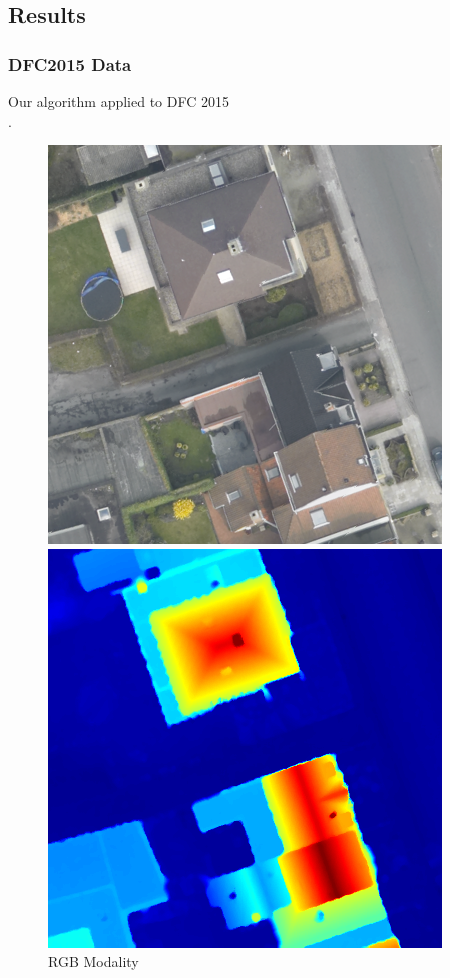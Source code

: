 \documentclass{beamer}
\begin{document}
\subsection{Results}
\begin{frame}
  \frametitle{DFC2015 Data}
  Our algorithm applied to DFC 2015\\ \cite{DFC2015}.
  \begin{figure}[ht]
    \begin{minipage}[b]{0.45\linewidth}
      \centering
      \includegraphics[width=\textwidth]{./Images/DFC2015/optical.png}
      \caption{RGB Modality}
    \end{minipage}
    \begin{minipage}[b]{0.45\linewidth}
      \centering
      \includegraphics[width=\textwidth]{./Images/DFC2015/lidarColor.png}

\end{minipage}
\end{figure}
\end{frame}
\end{document}

